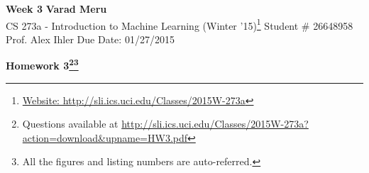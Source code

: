 \documentclass[a4paper, 11pt]{article}
\begin{document}
\begin{noindent}
\large\textbf{Week 3} \hfill \textbf{Varad Meru} \\
\normalsize CS 273a - Introduction to Machine Learning (Winter '15)\footnote{\href{http://sli.ics.uci.edu/Classes/2015W-273a}{Website: http://sli.ics.uci.edu/Classes/2015W-273a}} \hfill Student \# 26648958 \\
Prof. Alex Ihler \hfill Due Date: 01/27/2015
\end{noindent}
\noindent\makebox[\linewidth]{\rule{\textwidth}{0.4pt}}

\begin{center}
\textbf{\Large{Homework 3}\footnote{Questions available at \href{http://sli.ics.uci.edu/Classes/2015W-273a?action=download\&upname=HW2.pdf}{http://sli.ics.uci.edu/Classes/2015W-273a?action=download\&upname=HW3.pdf}}\footnote{All the figures and listing numbers are auto-referred.}}\\
\end{center}
\vspace{-25pt}

\end{document}
